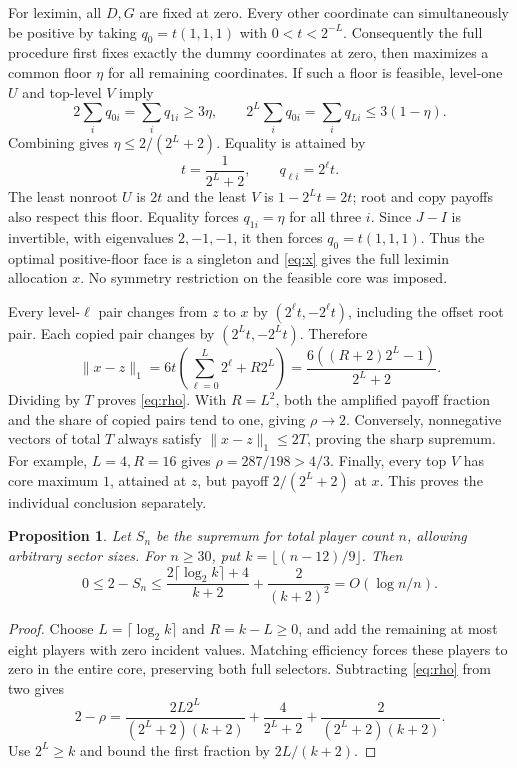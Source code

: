 \documentclass[11pt]{article}
\newtheorem{proposition}{Proposition}
\begin{document}
For leximin, all $D,G$ are fixed at zero. Every other coordinate can
simultaneously be positive by taking $q_0=t(1,1,1)$ with $0<t<2^{-L}$.
Consequently the full procedure first fixes exactly the dummy coordinates
at zero, then maximizes a common floor $\eta$ for all remaining coordinates.
If such a floor is feasible, level-one $U$ and top-level $V$ imply
\[
 2\sum_iq_{0i}=\sum_iq_{1i}\ge3\eta,\qquad
 2^L\sum_iq_{0i}=\sum_iq_{Li}\le3(1-\eta).
\]
Combining gives $\eta\le2/(2^L+2)$. Equality is attained by
\begin{equation}\label{eq:x}
 t=\frac1{2^L+2},\qquad q_{\ell i}=2^\ell t.
\end{equation}
The least nonroot $U$ is $2t$ and the least $V$ is $1-2^Lt=2t$;
root and copy payoffs also respect this floor. Equality forces
$q_{1i}=\eta$ for all three $i$. Since $J-I$ is invertible, with eigenvalues
$2,-1,-1$, it then forces $q_0=t(1,1,1)$. Thus the optimal positive-floor
face is a singleton and \eqref{eq:x} gives the full leximin allocation $x$.
No symmetry restriction on the feasible core was imposed.

Every level-$\ell$ pair changes from $z$ to $x$ by
$(2^\ell t,-2^\ell t)$, including the offset root pair. Each copied pair
changes by $(2^Lt,-2^Lt)$. Therefore
\[
 \|x-z\|_1=6t\left(\sum_{\ell=0}^{L}2^\ell+R2^L\right)
 =\frac{6((R+2)2^L-1)}{2^L+2}.
\]
Dividing by $T$ proves \eqref{eq:rho}. With $R=L^2$, both the amplified
payoff fraction and the share of copied pairs tend to one, giving $\rho\to2$.
Conversely, nonnegative vectors of total $T$ always satisfy
$\|x-z\|_1\le2T$, proving the sharp supremum.
For example, $L=4,R=16$ gives $\rho=287/198>4/3$.
Finally, every top $V$ has core maximum $1$, attained at $z$, but payoff
$2/(2^L+2)$ at $x$. This proves the individual conclusion separately.

\begin{proposition}\label{prop:dimension}
Let $S_n$ be the supremum for total player count $n$, allowing arbitrary sector
sizes. For $n\ge30$, put $k=\lfloor(n-12)/9\rfloor$. Then
\[
 0\le2-S_n\le
 \frac{2\lceil\log_2 k\rceil+4}{k+2}+\frac{2}{(k+2)^2}
 =O(\log n/n).
\]
\end{proposition}
\begin{proof}
Choose $L=\lceil\log_2 k\rceil$ and $R=k-L\ge0$, and add the remaining
at most eight players with zero incident values. Matching efficiency forces
these players to zero in the entire core, preserving both full selectors.
Subtracting \eqref{eq:rho} from two gives
\[
 2-\rho=\frac{2L2^L}{(2^L+2)(k+2)}
       +\frac4{2^L+2}+\frac2{(2^L+2)(k+2)}.
\]
Use $2^L\ge k$ and bound the first fraction by $2L/(k+2)$.
\end{proof}
\end{document}
